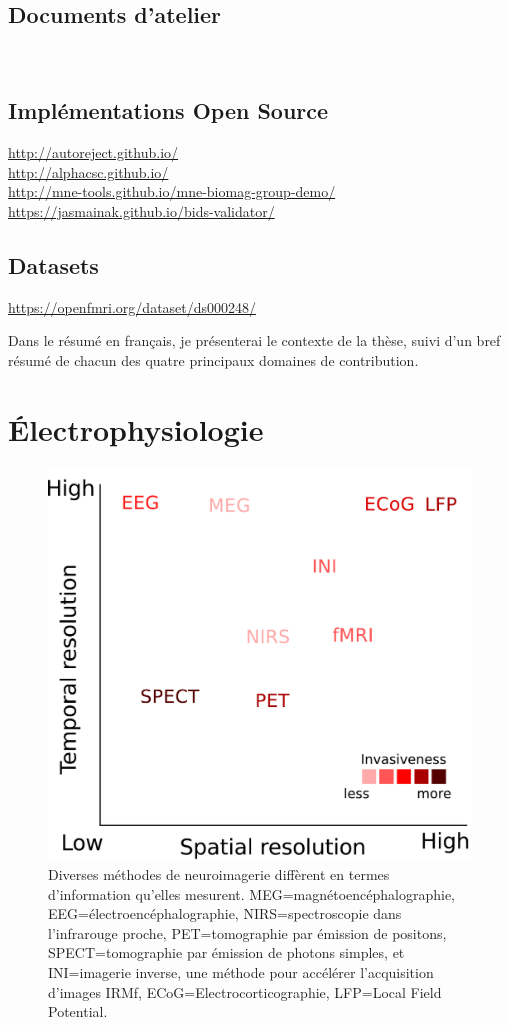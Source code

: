 \subsection*{Documents d'atelier}
\

\subsection*{Implémentations Open Source}

\url{http://autoreject.github.io/} \\
\url{http://alphacsc.github.io/} \\
\url{http://mne-tools.github.io/mne-biomag-group-demo/}\\
\url{https://jasmainak.github.io/bids-validator/}

\subsection*{Datasets}

\url{https://openfmri.org/dataset/ds000248/}

Dans le résumé en français, je présenterai le contexte de la thèse, suivi d'un bref résumé de chacun des quatre principaux domaines de contribution.

\section*{Électrophysiologie}

\begin{figure}[htb]
\begin{center}
   \includegraphics[width=0.6\linewidth]{figures/neuroimaging_methods.pdf}
\end{center}
   \caption[]{Diverses méthodes de neuroimagerie diffèrent en termes d'information qu'elles mesurent. MEG=magnétoencéphalographie, EEG=électroencéphalographie, NIRS=spectroscopie dans l'infrarouge proche, PET=tomographie par émission de positons, SPECT=tomographie par émission de photons simples, et INI=imagerie inverse, une méthode pour accélérer l'acquisition d'images IRMf, ECoG=Electrocorticographie, LFP=Local Field Potential.}
   \label{fig:sommaire:neuroimaging_methods}
\end{figure}

